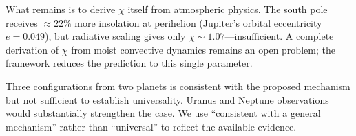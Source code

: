 What remains is to derive $\chi$ itself from atmospheric physics.
The south pole receives $\approx 22\%$ more insolation at perihelion
(Jupiter's orbital eccentricity $e = 0.049$), but radiative scaling
gives only $\chi \sim 1.07$---insufficient.  A complete derivation
of $\chi$ from moist convective dynamics remains an open problem;
the framework reduces the prediction to this single parameter.

Three configurations from two planets is consistent with the proposed
mechanism but not sufficient to establish universality.  Uranus and
Neptune observations would substantially strengthen the case.  We use
``consistent with a general mechanism'' rather than ``universal'' to
reflect the available evidence.






